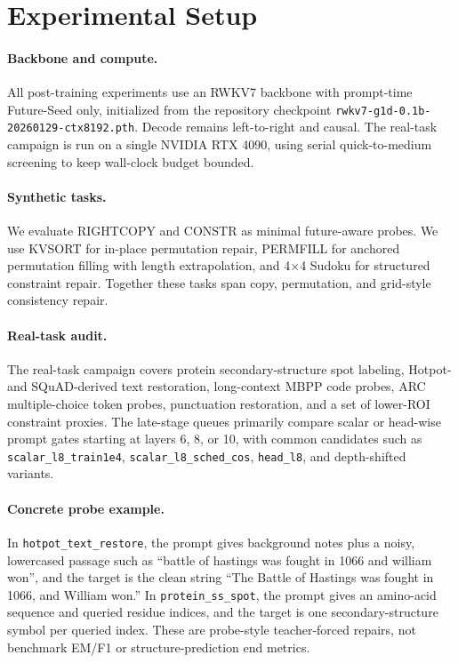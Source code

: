 \documentclass{article}
\begin{document}
\section{Experimental Setup}
\paragraph{Backbone and compute.}
All post-training experiments use an RWKV7 backbone with prompt-time Future-Seed only, initialized from the repository checkpoint \texttt{rwkv7-g1d-0.1b-20260129-ctx8192.pth}. Decode remains left-to-right and causal. The real-task campaign is run on a single NVIDIA RTX 4090, using serial quick-to-medium screening to keep wall-clock budget bounded.

\paragraph{Synthetic tasks.}
We evaluate RIGHTCOPY and CONSTR as minimal future-aware probes. We use KVSORT for in-place permutation repair, PERMFILL for anchored permutation filling with length extrapolation, and 4$\times$4 Sudoku for structured constraint repair. Together these tasks span copy, permutation, and grid-style consistency repair.

\paragraph{Real-task audit.}
The real-task campaign covers protein secondary-structure spot labeling, Hotpot- and SQuAD-derived text restoration, long-context MBPP code probes, ARC multiple-choice token probes, punctuation restoration, and a set of lower-ROI constraint proxies. The late-stage queues primarily compare scalar or head-wise prompt gates starting at layers 6, 8, or 10, with common candidates such as \texttt{scalar\_l8\_train1e4}, \texttt{scalar\_l8\_sched\_cos}, \texttt{head\_l8}, and depth-shifted variants.

\paragraph{Concrete probe example.}
In \texttt{hotpot\_text\_restore}, the prompt gives background notes plus a noisy, lowercased passage such as ``battle of hastings was fought in 1066 and william won'', and the target is the clean string ``The Battle of Hastings was fought in 1066, and William won.'' In \texttt{protein\_ss\_spot}, the prompt gives an amino-acid sequence and queried residue indices, and the target is one secondary-structure symbol per queried index. These are probe-style teacher-forced repairs, not benchmark EM/F1 or structure-prediction end metrics.
\end{document}
